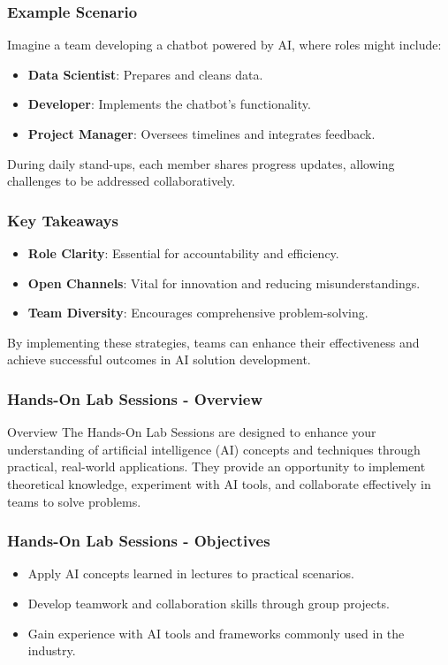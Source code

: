 \documentclass[aspectratio=169]{beamer}
\begin{document}
\begin{frame}[fragile]
    \frametitle{Example Scenario}
    Imagine a team developing a chatbot powered by AI, where roles might include:
    \begin{itemize}
        \item \textbf{Data Scientist}: Prepares and cleans data.
        \item \textbf{Developer}: Implements the chatbot's functionality.
        \item \textbf{Project Manager}: Oversees timelines and integrates feedback.
    \end{itemize}
    During daily stand-ups, each member shares progress updates, allowing challenges to be addressed collaboratively.
\end{frame}

\begin{frame}[fragile]
    \frametitle{Key Takeaways}
    \begin{itemize}
        \item \textbf{Role Clarity}: Essential for accountability and efficiency.
        \item \textbf{Open Channels}: Vital for innovation and reducing misunderstandings.
        \item \textbf{Team Diversity}: Encourages comprehensive problem-solving.
    \end{itemize}
    By implementing these strategies, teams can enhance their effectiveness and achieve successful outcomes in AI solution development.
\end{frame}

\begin{frame}
    \frametitle{Hands-On Lab Sessions - Overview}
    \begin{block}{Overview}
        The Hands-On Lab Sessions are designed to enhance your understanding of artificial intelligence (AI) concepts and techniques through practical, real-world applications. They provide an opportunity to implement theoretical knowledge, experiment with AI tools, and collaborate effectively in teams to solve problems.
    \end{block}
\end{frame}

\begin{frame}
    \frametitle{Hands-On Lab Sessions - Objectives}
    \begin{itemize}
        \item Apply AI concepts learned in lectures to practical scenarios.
        \item Develop teamwork and collaboration skills through group projects.
        \item Gain experience with AI tools and frameworks commonly used in the industry.
    \end{itemize}
\end{frame}
\end{document}
